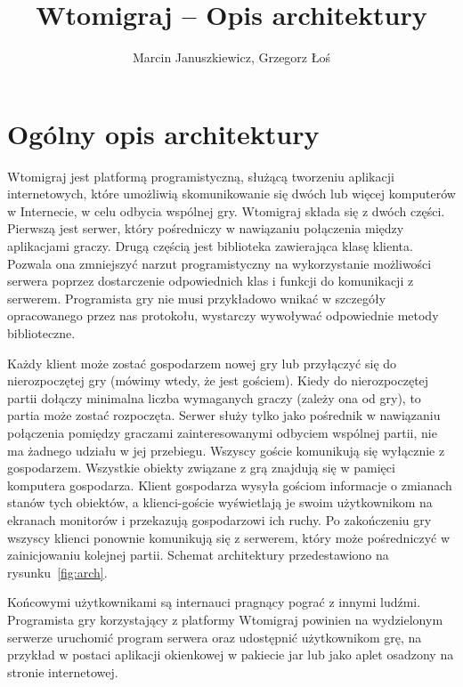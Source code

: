 \documentclass[a4paper, 12pt]{article}
\author{Marcin Januszkiewicz, Grzegorz Łoś}
\title{\textbf{Wtomigraj} -- Opis architektury}
\begin{document}


\setcounter{page}{2}

\tableofcontents

\break

\section{Ogólny opis architektury}

Wtomigraj jest platformą programistyczną, służącą tworzeniu aplikacji internetowych, które umożliwią skomunikowanie się dwóch lub więcej komputerów w Internecie, w celu odbycia wspólnej gry. Wtomigraj składa się z dwóch części. Pierwszą jest serwer, który pośredniczy w nawiązaniu połączenia między aplikacjami graczy. Drugą częścią jest biblioteka zawierająca klasę klienta. Pozwala ona zmniejszyć narzut programistyczny na wykorzystanie możliwości serwera poprzez dostarczenie odpowiednich klas i funkcji do komunikacji z serwerem. Programista gry nie musi przykładowo wnikać w szczegóły opracowanego przez nas protokołu, wystarczy wywoływać odpowiednie metody biblioteczne. 

Każdy klient może zostać gospodarzem nowej gry lub przyłączyć się do nierozpoczętej gry (mówimy wtedy, że jest gościem). Kiedy do nierozpoczętej partii dołączy minimalna liczba wymaganych graczy (zależy ona od gry), to partia może zostać rozpoczęta. Serwer służy tylko jako pośrednik w nawiązaniu połączenia pomiędzy graczami zainteresowanymi odbyciem wspólnej partii, nie ma żadnego udziału w jej przebiegu. Wszyscy goście komunikują się wyłącznie z gospodarzem. Wszystkie obiekty związane z grą znajdują się w pamięci komputera gospodarza. Klient gospodarza wysyła gościom informacje o zmianach stanów tych obiektów, a klienci-goście wyświetlają je swoim użytkownikom na ekranach monitorów i przekazują gospodarzowi ich ruchy. Po zakończeniu gry wszyscy klienci ponownie komunikują się z serwerem, który może pośredniczyć w zainicjowaniu kolejnej partii. Schemat architektury przedestawiono na rysunku~\ref{fig:arch}.

Końcowymi użytkownikami są internauci pragnący pograć z innymi ludźmi. Programista gry korzystający z platformy Wtomigraj powinien na wydzielonym serwerze uruchomić program serwera oraz udostępnić użytkownikom grę, na przykład w postaci aplikacji okienkowej w pakiecie jar lub jako aplet osadzony na stronie internetowej.
\end{document}

